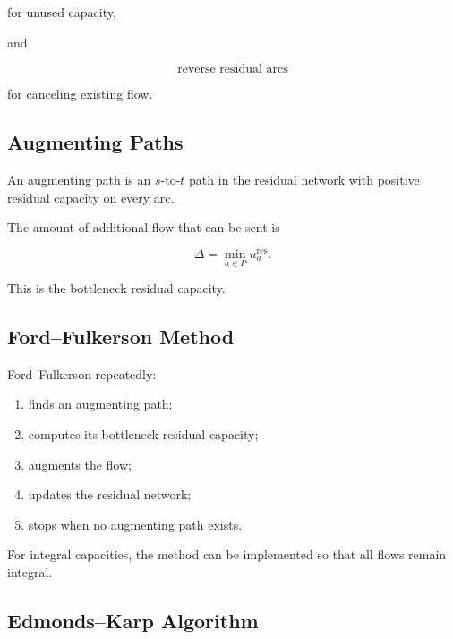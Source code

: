 for unused capacity,

and

\[
\boxed{
\text{reverse residual arcs}
}
\]

for canceling existing flow.

\subsection{Augmenting Paths}
\label{subsec:augmenting-paths}

An augmenting path is an \(s\)-to-\(t\) path in the residual network with
positive residual capacity on every arc.

The amount of additional flow that can be sent is

\[
\boxed{
\Delta
=
\min_{a\in P}
u_a^{\mathrm{res}}.
}
\]

This is the bottleneck residual capacity.

\subsection{Ford--Fulkerson Method}
\label{subsec:ford-fulkerson}

Ford--Fulkerson repeatedly:

\begin{enumerate}
    \item finds an augmenting path;
    \item computes its bottleneck residual capacity;
    \item augments the flow;
    \item updates the residual network;
    \item stops when no augmenting path exists.
\end{enumerate}

For integral capacities, the method can be implemented so that all flows
remain integral.

\subsection{Edmonds--Karp Algorithm}
\label{subsec:edmonds-karp}

